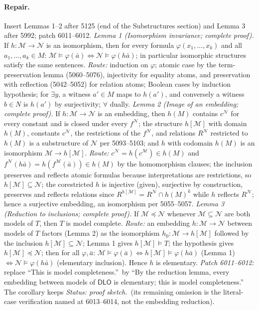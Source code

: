 \paragraph{Repair.} Insert Lemmas 1--2 after 5125 (end of the
Substructures section) and Lemma 3 after 5992; patch 6011--6012.
\emph{Lemma 1 (Isomorphism invariance; complete proof).}  If
\(h:\mathcal M\to\mathcal N\) is an isomorphism, then for every formula
\(\varphi(x_1,\ldots,x_k)\) and all \(a_1,\ldots,a_k\in M\):
\(\mathcal M\models\varphi(\bar a)\iff\mathcal N\models\varphi(h\bar a)\);
in particular isomorphic structures satisfy the same sentences.
\emph{Route:} induction on \(\varphi\); atomic case by the
term-preservation lemma (5060--5076), injectivity for equality atoms, and
preservation with reflection (5042--5052) for relation atoms; Boolean cases
by induction hypothesis; for \(\exists y\), a witness \(a'\in M\) maps to
\(h(a')\), and conversely a witness \(b\in N\) is \(h(a')\) by
surjectivity; \(\forall\) dually.
\emph{Lemma 2 (Image of an embedding; complete proof).}  If
\(h:\mathcal M\to\mathcal N\) is an embedding, then \(h(M)\) contains
\(c^{\mathcal N}\) for every constant and is closed under every
\(f^{\mathcal N}\); the structure \(h[\mathcal M]\) with domain \(h(M)\),
constants \(c^{\mathcal N}\), the restrictions of the \(f^{\mathcal N}\),
and relations \(R^{\mathcal N}\) restricted to \(h(M)\) is a substructure
of \(\mathcal N\) per 5093--5103; and \(h\) with codomain \(h(M)\) is an
isomorphism \(\mathcal M\to h[\mathcal M]\).  \emph{Route:}
\(c^{\mathcal N}=h(c^{\mathcal M})\in h(M)\) and
\(f^{\mathcal N}(h\bar a)=h(f^{\mathcal M}(\bar a))\in h(M)\) by the
homomorphism clauses; the inclusion preserves and reflects atomic formulas
because interpretations are restrictions, so \(h[\mathcal M]\subseteq
\mathcal N\); the corestricted \(h\) is injective (given), surjective by
construction, preserves and reflects relations since
\(R^{h[\mathcal M]}=R^{\mathcal N}\cap h(M)^{k}\) while \(h\) reflects
\(R^{\mathcal N}\); hence a surjective embedding, an isomorphism per
5055--5057.
\emph{Lemma 3 (Reduction to inclusions; complete proof).}  If
\(\mathcal M\preccurlyeq\mathcal N\) whenever
\(\mathcal M\subseteq\mathcal N\) are both models of \(T\), then \(T\) is
model complete.  \emph{Route:} an embedding \(h:\mathcal M\to\mathcal N\)
between models of \(T\) factors (Lemma 2) as the isomorphism
\(h_0:\mathcal M\to h[\mathcal M]\) followed by the inclusion
\(h[\mathcal M]\subseteq\mathcal N\); Lemma 1 gives
\(h[\mathcal M]\models T\); the hypothesis gives
\(h[\mathcal M]\preccurlyeq\mathcal N\); then for all \(\varphi,\bar a\):
\(\mathcal M\models\varphi(\bar a)\iff h[\mathcal M]\models
\varphi(h\bar a)\) (Lemma 1) \(\iff\mathcal N\models\varphi(h\bar a)\)
(elementary inclusion).  Hence \(h\) is elementary.
\emph{Patch 6011--6012:} replace ``This is model completeness.''\ by ``By
the reduction lemma, every embedding between models of \(\mathsf{DLO}\) is
elementary; this is model completeness.''  The corollary keeps
\textit{Status: proof sketch.}\ (its remaining omission is the literal-case
verification named at 6013--6014, not the embedding reduction).

